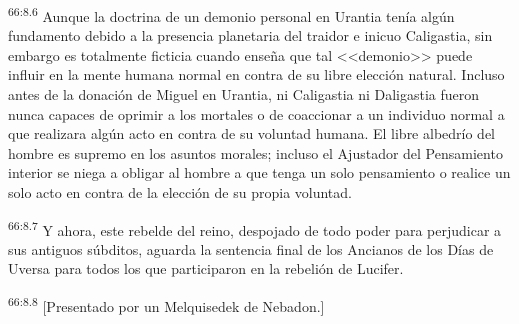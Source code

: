 \par
\textsuperscript{66:8.6} Aunque la doctrina de un demonio personal en Urantia tenía algún fundamento debido a la presencia planetaria del traidor e inicuo Caligastia, sin embargo es totalmente ficticia cuando enseña que tal <<demonio>> puede influir en la mente humana normal en contra de su libre elección natural. Incluso antes de la donación de Miguel en Urantia, ni Caligastia ni Daligastia fueron nunca capaces de oprimir a los mortales o de coaccionar a un individuo normal a que realizara algún acto en contra de su voluntad humana. El libre albedrío del hombre es supremo en los asuntos morales; incluso el Ajustador del Pensamiento interior se niega a obligar al hombre a que tenga un solo pensamiento o realice un solo acto en contra de la elección de su propia voluntad.

\par
\textsuperscript{66:8.7} Y ahora, este rebelde del reino, despojado de todo poder para perjudicar a sus antiguos súbditos, aguarda la sentencia final de los Ancianos de los Días de Uversa para todos los que participaron en la rebelión de Lucifer.

\par
\textsuperscript{66:8.8} [Presentado por un Melquisedek de Nebadon.]